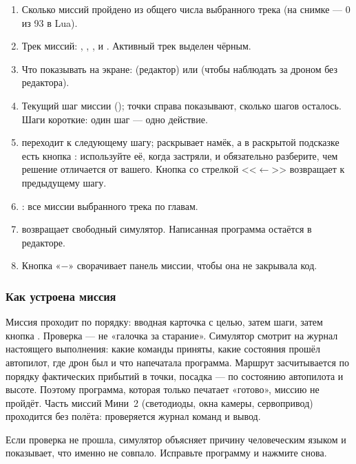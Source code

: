 \begin{enumerate}[label=\bubble{\arabic*}]
    \item Сколько миссий пройдено из общего числа выбранного трека (на снимке --- 0 из 93 в Lua).
    \item Трек миссий: , , ,  и . Активный трек выделен чёрным.
    \item Что показывать на экране:  (редактор) или  (чтобы наблюдать за дроном без редактора).
    \item Текущий шаг миссии (); точки справа показывают, сколько шагов осталось. Шаги короткие: один шаг --- одно действие.
    \item {} переходит к следующему шагу;  раскрывает намёк, а в раскрытой подсказке есть кнопка : используйте её, когда застряли, и обязательно разберите, чем решение отличается от вашего. Кнопка со стрелкой <<$\leftarrow$>> возвращает к предыдущему шагу.
    \item {}: все миссии выбранного трека по главам.
    \item {} возвращает свободный симулятор. Написанная программа остаётся в редакторе.
    \item Кнопка «$-$» сворачивает панель миссии, чтобы она не закрывала код.
\end{enumerate}

\subsubsection{Как устроена миссия}

Миссия проходит по порядку: вводная карточка с целью, затем шаги, затем кнопка . Проверка --- не «галочка за старание». Симулятор смотрит на журнал настоящего выполнения: какие команды приняты, какие состояния прошёл автопилот, где дрон был и что напечатала программа. Маршрут засчитывается по порядку фактических прибытий в точки, посадка --- по состоянию автопилота и высоте. Поэтому программа, которая только печатает «готово», миссию не пройдёт. Часть миссий Мини~2 (светодиоды, окна камеры, сервопривод) проходится без полёта: проверяется журнал команд и вывод.

Если проверка не прошла, симулятор объясняет причину человеческим языком и показывает, что именно не совпало. Исправьте программу и нажмите  снова.


